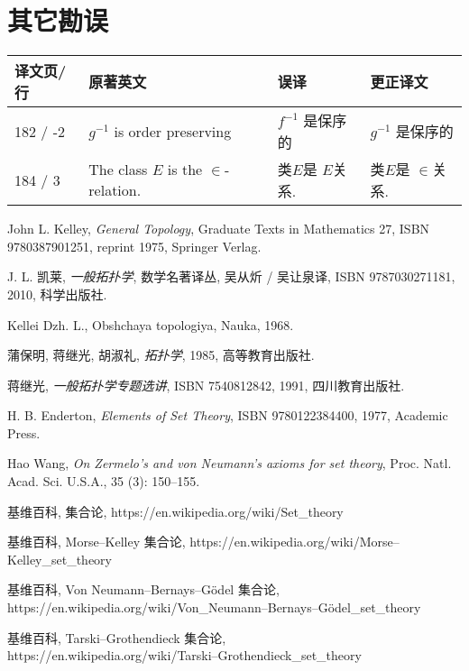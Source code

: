 \documentclass[zihao=-4,a4paper]{ctexart}
\begin{document}
\section{其它勘误}

\begin{tabular}{l l l l }
	\hline
	{\kaishu 译文页/行} & {\kaishu 原著英文} & {\kaishu 误译} & {\kaishu 更正译文} \\
	\hline
	182 / -2 & $g^{-1}$ is order preserving  & $f^{-1}$ 是保序的 & $g^{-1}$ 是保序的 \\
	184 / 3 & The class $E$ is the $\in$-relation. &类$E$是 $E$关系. & 类$E$是 $\in$关系. \\
	\hline
\end{tabular}






\begin{thebibliography}{9}
John L. Kelley,  \emph{General Topology}, Graduate Texts in Mathematics 27, ISBN 9780387901251, reprint 1975, Springer Verlag.
	
J. L. 凯莱,  \emph{一般拓扑学}, 数学名著译丛, 吴从炘 / 吴让泉译, ISBN 9787030271181, 2010, 科学出版社.

{\selectfont Kellei D{zh}. L., Ob{shch}a{ya} topologi{ya}, Nauka,} 1968.


蒲保明, 蒋继光, 胡淑礼, \emph{拓扑学}, 1985, 高等教育出版社.

蒋继光, \emph{一般拓扑学专题选讲}, ISBN 7540812842, 1991, 四川教育出版社.
	
H. B. Enderton, \emph{Elements of Set Theory}, ISBN 9780122384400, 1977, Academic Press.
	
Hao Wang, \emph{On Zermelo's and von Neumann's axioms for set theory}, Proc. Natl. Acad. Sci. U.S.A., 35 (3): 150–155.

基维百科, 集合论,	https://en.wikipedia.org/wiki/Set\_theory

基维百科, Morse–Kelley 集合论,	https://en.wikipedia.org/wiki/Morse–Kelley\_set\_theory

基维百科, Von Neumann–Bernays–Gödel  集合论,\\ https://en.wikipedia.org/wiki/Von\_Neumann–Bernays–Gödel\_set\_theory

基维百科, Tarski–Grothendieck  集合论,\\
https://en.wikipedia.org/wiki/Tarski–Grothendieck\_set\_theory

\end{thebibliography}
\end{document}
